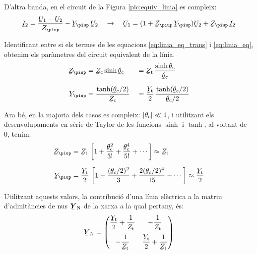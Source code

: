 D'altra banda, en el circuit de la Figura \vref{pic:equiv_linia} es compleix:
\begin{equation}\label{eq:linia_eq}
   \cmplx{I}_2 = \frac{\cmplx{U}_1 - \cmplx{U}_2}{\cmplx{Z}_\piup} - \cmplx{Y}_\piup\, \cmplx{U}_2
   \quad \rightarrow\quad
   \cmplx{U}_1 = (1 + \cmplx{Z}_\piup\,\cmplx{Y}_\piup ) \cmplx{U}_2 + \cmplx{Z}_\piup\,\cmplx{I}_2
\end{equation}

Identificant entre si els termes de les equacions
\eqref{eq:linia_eq_trans} i \eqref{eq:linia_eq}, obtenim els
paràmetres del circuit equivalent de la línia.
\begin{alignat}{2}
   \cmplx{Z}_\piup &= \cmplx{Z}\ped{c} \sinh \cmplx{\theta}\ped{c} &&= \cmplx{Z}\ped{t} \,
   \frac{\sinh \cmplx{\theta}\ped{c}}{\cmplx{\theta}\ped{c}} \\[1.5ex]
   \cmplx{Y}_\piup &= \frac{\tanh (\cmplx{\theta}\ped{c} / 2) }{\cmplx{Z}\ped{c}} &&=
   \frac{\cmplx{Y}\ped{t}}{2} \, \frac{\tanh (\cmplx{\theta}\ped{c} / 2)}{\cmplx{\theta}\ped{c} / 2}
\end{alignat}

Ara bé, en la majoria dels casos es compleix: $|\cmplx{\theta}\ped{c}| \ll 1$, i utilitzant els desenvolupaments en sèrie de Taylor de les funcions $\sinh$ i $\tanh$, al voltant de 0, tenim:
\begin{align}
   \cmplx{Z}_\piup &= \cmplx{Z}\ped{t} \, \left[ 1 + \frac{\cmplx{\theta}\ped{c}^2}{3!} +
   \frac{\cmplx{\theta}\ped{c}^4}{5!} + \cdots \right] \approx \cmplx{Z}\ped{t} \\[1.5ex]
   \cmplx{Y}_\piup &= \frac{\cmplx{Y}\ped{t}}{2} \,\left[ 1 - \frac{(\cmplx{\theta}\ped{c}/2)^2}{3} + \frac{2 (\cmplx{\theta}\ped{c}/2)^4}{15} - \cdots \right] \approx \frac{\cmplx{Y}\ped{t}}{2}
\end{align}

Utilitzant aquests valors, la contribució d'una línia elèctrica a
la matriu d'admitàncies de nus $\mcmplx{Y}\ped{N}$ de la xarxa a la
qual pertany, és: 
\begin{equation}
   \mcmplx{Y}\ped{N} = \begin{pmatrix}
     \dfrac{\cmplx{Y}\ped{t}}{2} + \dfrac{1}{\cmplx{Z}\ped{t}} & -\dfrac{1}{\cmplx{Z}\ped{t}}\\[2.5ex]
     -\dfrac{1}{\cmplx{Z}\ped{t}} & \dfrac{\cmplx{Y}\ped{t}}{2} + \dfrac{1}{\cmplx{Z}\ped{t}}
   \end{pmatrix}
\end{equation}

